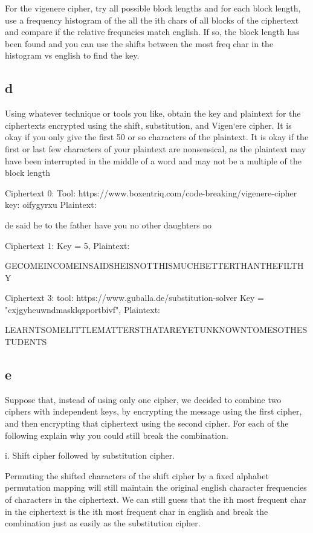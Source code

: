 \documentclass[11pt]{article}
\begin{document}
For the vigenere cipher, try all possible block lengths and for each block length, use a frequency histogram of the all the ith chars of all blocks of the ciphertext and compare if the relative frequncies match english. If so, the block length has been found and you can use the shifts between the most freq char in the histogram vs english to find the key.

\subsection{d}

Using whatever technique or tools you like, obtain the key and plaintext for the ciphertexts encrypted using the shift, substitution, and Vigen`ere cipher. It is okay if you only give the ﬁrst 50 or so characters of the plaintext. It is okay if the ﬁrst or last few characters of your plaintext are nonsensical, as the plaintext may have been interrupted in the middle of a word and may not be a multiple of the block length

Ciphertext 0: Tool: https://www.boxentriq.com/code-breaking/vigenere-cipher key: oifygyrxu Plaintext:

de said he to the father have you no other daughters no 

Ciphertext 1: Key = 5, Plaintext:

GECOMEINCOMEINSAIDSHEISNOTTHISMUCHBETTERTHANTHEFILTHY

Ciphertext 3: tool: https://www.guballa.de/substitution-solver Key = "cxjgyheuwndmasklqzportbivf", Plaintext:

LEARNTSOMELITTLEMATTERSTHATAREYETUNKNOWNTOMESOTHESTUDENTS


\subsection{e}

Suppose that, instead of using only one cipher, we decided to combine two ciphers with independent keys, by encrypting the message using the ﬁrst cipher, and then encrypting that ciphertext using the second cipher. For each of the following explain why you could still break the combination.

i. Shift cipher followed by substitution cipher.

Permuting the shifted characters of the shift cipher by a fixed alphabet permutation mapping will still maintain the original english character frequencies of characters in the ciphertext. We can still guess that the ith most frequent char in the ciphertext is the ith most frequent char in english and break the combination just as easily as the substitution cipher.
\end{document}
